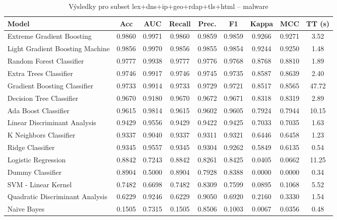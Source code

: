 \begin{table}[H]
  \centering
  \small
  \caption{Výsledky pro subset lex+dns+ip+geo+rdap+tls+html – malware}
  \begin{tabular}{|l|c|c|c|c|c|c|c|c|}
    \hline
    \textbf{Model} & \textbf{Acc} & \textbf{AUC} & \textbf{Recall} & \textbf{Prec.} & \textbf{F1} & \textbf{Kappa} & \textbf{MCC} & \textbf{TT (s)} \\
    \hline
    Extreme Gradient Boosting & 0.9860 & 0.9971 & 0.9860 & 0.9859 & 0.9859 & 0.9266 & 0.9271 & 3.52 \\
    Light Gradient Boosting Machine & 0.9856 & 0.9970 & 0.9856 & 0.9855 & 0.9854 & 0.9244 & 0.9250 & 1.48 \\
    Random Forest Classifier & 0.9777 & 0.9938 & 0.9777 & 0.9776 & 0.9768 & 0.8768 & 0.8810 & 1.89 \\
    Extra Trees Classifier & 0.9746 & 0.9917 & 0.9746 & 0.9745 & 0.9735 & 0.8587 & 0.8639 & 2.40 \\
    Gradient Boosting Classifier & 0.9733 & 0.9914 & 0.9733 & 0.9729 & 0.9721 & 0.8517 & 0.8565 & 47.72 \\
    Decision Tree Classifier & 0.9670 & 0.9180 & 0.9670 & 0.9672 & 0.9671 & 0.8318 & 0.8319 & 2.89 \\
    Ada Boost Classifier & 0.9615 & 0.9814 & 0.9615 & 0.9602 & 0.9605 & 0.7924 & 0.7944 & 10.15 \\
    Linear Discriminant Analysis & 0.9429 & 0.9556 & 0.9429 & 0.9422 & 0.9425 & 0.7033 & 0.7035 & 1.63 \\
    K Neighbors Classifier & 0.9337 & 0.9040 & 0.9337 & 0.9311 & 0.9321 & 0.6446 & 0.6458 & 1.23 \\
    Ridge Classifier & 0.9345 & 0.9557 & 0.9345 & 0.9304 & 0.9262 & 0.5849 & 0.6135 & 0.54 \\
    Logistic Regression & 0.8842 & 0.7243 & 0.8842 & 0.8261 & 0.8425 & 0.0405 & 0.0662 & 11.25 \\
    Dummy Classifier & 0.8904 & 0.5000 & 0.8904 & 0.7928 & 0.8388 & 0.0000 & 0.0000 & 0.34 \\
    SVM - Linear Kernel & 0.7482 & 0.6698 & 0.7482 & 0.8309 & 0.7599 & 0.0895 & 0.1068 & 5.52 \\
    Quadratic Discriminant Analysis & 0.6229 & 0.9246 & 0.6229 & 0.9050 & 0.6920 & 0.2160 & 0.3330 & 1.54 \\
    Naive Bayes & 0.1505 & 0.7315 & 0.1505 & 0.8506 & 0.1003 & 0.0067 & 0.0356 & 0.48 \\
    \hline
  \end{tabular}
\end{table}
\vspace{0.5cm}

